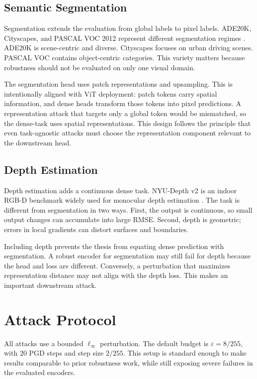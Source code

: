 \subsection{Semantic Segmentation}

Segmentation extends the evaluation from global labels to pixel labels. ADE20K, Cityscapes, and PASCAL VOC 2012 represent different segmentation regimes \parencite{ADE1,ADE2,Cordts2016cityScapes,Everingham10pascalVoc}. ADE20K is scene-centric and diverse. Cityscapes focuses on urban driving scenes. PASCAL VOC contains object-centric categories. This variety matters because robustness should not be evaluated on only one visual domain.

The segmentation head uses patch representations and upsampling. This is intentionally aligned with ViT deployment: patch tokens carry spatial information, and dense heads transform those tokens into pixel predictions. A representation attack that targets only a global token would be mismatched, so the dense-task \EmbedAttack uses spatial representations. This design follows the principle that even task-agnostic attacks must choose the representation component relevant to the downstream head.

\subsection{Depth Estimation}

Depth estimation adds a continuous dense task. NYU-Depth v2 is an indoor RGB-D benchmark widely used for monocular depth estimation \parencite{Silberman2012NYU}. The task is different from segmentation in two ways. First, the output is continuous, so small output changes can accumulate into large RMSE. Second, depth is geometric; errors in local gradients can distort surfaces and boundaries.

Including depth prevents the thesis from equating dense prediction with segmentation. A robust encoder for segmentation may still fail for depth because the head and loss are different. Conversely, a perturbation that maximizes representation distance may not align with the depth loss. This makes \DepthPGD an important downstream attack.

\section{Attack Protocol}

All attacks use a bounded $\ell_\infty$ perturbation. The default budget is $\varepsilon=8/255$, with 20 PGD steps and step size $2/255$. This setup is standard enough to make results comparable to prior robustness work, while still exposing severe failures in the evaluated encoders.

